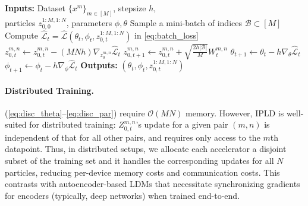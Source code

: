 \documentclass[twoside]{article}
\begin{document}
\begin{algorithm}[H]
    \caption{Interacting Particle Latent Diffusion (\gls*{IPLD})}\label{algo:train_basic}
    \begin{algorithmic}[1]
        \linespread{1.2}\selectfont
        \State \textbf{Inputs:} Dataset $\{ x^m\}_{m\in [M]}$, 
        stepsize $h$,
        \\ particles $z_{0,0}^{1:M,1:N}$, parameters $\phi,\theta$
            \State Sample a mini-batch of indices $\mathcal{B}\subset [M]$
            \State Compute $\hat{\mathcal{L}}_t = \hat{\mathcal{L}}
            (\theta_t,\phi_t,z^{1:M,1:N}_{0,t})$ in \eqref{eq:batch_loss}
        \State ${z_{0,t}^{m,n} \gets z_{0,t}^{m,n} -(MNh)\nabla_{ z_{0}^{m,n}}\hat{\mathcal{L}}_t}$
        \EndIf
        \State $z_{0,t+1}^{m,n} \gets z_{0,t}^{m,n} +\sqrt{\frac{2h|\mathcal{B}|}{M}}W_{t}^{m,n}$ 
    \EndFor
    \State $\theta_{t+1} \gets \theta_t - h \nabla_{\theta} \hat{\mathcal{L}}_t$
    \State $\phi_{t+1} \gets \phi_t - h \nabla_{\phi} \hat{\mathcal{L}}_t$
\EndWhile
\State \textbf{Outputs:} $(\theta_{t}, \phi_t, z_{0,t}^{1:M, 1:N})$
\end{algorithmic}
\end{algorithm}
\paragraph{Distributed Training.} (\ref{eq:disc_theta}--\ref{eq:disc_par}) require $\mathcal{O}(MN)$ memory. However, \gls*{IPLD} is well-suited for distributed training: $Z^{m,n}_{0,t}$'s update for a given pair $(m,n)$ is independent of that for all other pairs, and requires only access to the $m$th datapoint. Thus, in distributed setups, we allocate each accelerator a disjoint subset of the training set and it handles the corresponding updates for all $N$ particles, reducing per-device memory costs and communication costs. This contrasts with autoencoder-based \glspl*{LDM} that necessitate synchronizing gradients for encoders (typically, deep networks) when trained end-to-end. 
\end{document}
